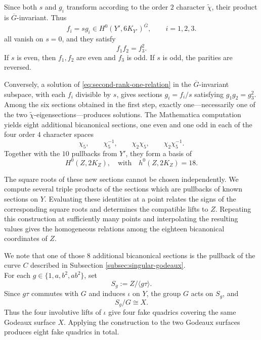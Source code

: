 \documentclass[11pt,a4paper]{article}
\begin{document}
Since both \(s\) and \(g_i\) transform according to the order $2$
character \(\tilde\chi\), their product is \(\overline G\)-invariant.
Thus
\[
        f_i=s g_i\in H^0(Y',6K_{Y'})^{\overline G},
        \qquad i=1,2,3.
\]
all vanish on \(s=0\), and they satisfy
\begin{equation}
        f_1f_2=f_3^2.
        \label{eq:second-rank-one-relation}
\end{equation}
If \(s\) is even, then \(f_1,f_2\) are even and \(f_3\) is odd. If
\(s\) is odd, the parities are reversed.

Conversely, a solution of \eqref{eq:second-rank-one-relation} in the
\(\overline G\)-invariant subspace, with each \(f_i\) divisible by \(s\),
gives sections \(g_i=f_i/s\) satisfying \(g_1g_2=g_3^2\).
Among the six sections obtained in the first step,
exactly one---necessarily one of the two
\(\tilde\chi\)-eigensections---produces solutions.
The Mathematica \cite{Mathematica} computation yields
eight additional bicanonical sections, one even and one odd in each of the
four order $4$ character spaces
\[
 \chi _5,\qquad \chi _5^{-1},\qquad
 \chi _2\chi _5,\qquad \chi _2\chi _5^{-1}.
\]
Together with the $10$ pullbacks from \(Y'\), they form a basis of
\[
        H^0(Z,2K_Z),\quad \text{with}\quad h^0(Z,2K_Z)=18.
\]

The square roots of these new sections cannot be chosen independently.
We compute several triple products of the sections which are pullbacks of known
sections on \(Y\).  Evaluating these identities at a point relates the
signs of the corresponding square roots and determines the compatible
lifts to \(Z\).  Repeating this construction at sufficiently many points
and interpolating the resulting values gives the homogeneous relations
among the eighteen bicanonical coordinates of \(Z\).

We note that one of those $8$ additional bicanonical sections is the pullback of
the curve $C$ described in Subsection \ref{subsec:singular-godeaux}.\\



\newline
For each $g\in\{1,a,b^2,ab^2\}$, set
\[
S_g:=Z/\langle g\tau\rangle.
\]
Since $g\tau$ commutes with $G$ and induces $\iota$ on $Y$, the group
$G$ acts on $S_g$, and
\[
S_g/G\cong X.
\]
Thus the four involutive lifts of $\iota$ give four fake quadrics covering the same
Godeaux surface $X$.
Applying the construction to the two Godeaux surfaces produces eight fake quadrics in total.
\end{document}
